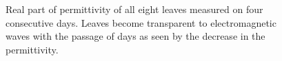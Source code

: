 \documentclass[preprints,article,accept,moreauthors,pdftex]{Definitions/mdpi}
\renewcommand{\^}{\hat}  %
\begin{document}
\begin{figure}[h!]
	\addtocounter{subfigure}{4}
	\centering
	\label{fig:lettuce_eps}
	\hfill
	\label{fig:parsley_eps}
	
	\label{fig:peashoot_eps}
	\hfill
	\label{fig:spinach_eps}
	\caption{Real part of permittivity of all eight leaves measured on four consecutive days. Leaves become transparent to electromagnetic waves with the passage of days as seen by the decrease in the permittivity.}
	\label{fig:Permittivity_all_leaves}
\end{figure}
\end{document}
